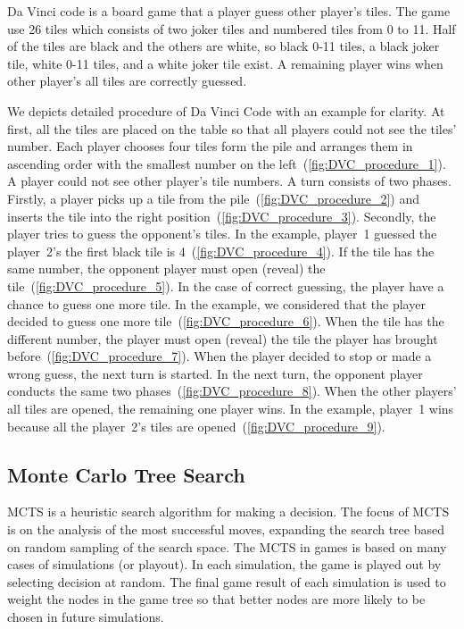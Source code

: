 Da Vinci code is a board game that a player guess other player's tiles.
The game use 26 tiles which consists of two joker tiles and numbered tiles from 0 to 11. 
Half of the tiles are black and the others are white, so black 0-11 tiles, a black joker tile, white 0-11 tiles, and a white joker tile exist.
A remaining player wins when other player's all tiles are correctly guessed.

We depicts detailed procedure of Da Vinci Code with an example for clarity.
At first, all the tiles are placed on the table so that all players could not see the tiles' number.
Each player chooses four tiles form the pile and arranges them in ascending order with the smallest number on the left~(\cref{fig:DVC_procedure_1}).
A player could not see other player's tile numbers.
A turn consists of two phases.
Firstly, a player picks up a tile from the pile~(\cref{fig:DVC_procedure_2}) and inserts the tile into the right position~(\cref{fig:DVC_procedure_3}).
Secondly, the player tries to guess the opponent's tiles.
In the example, player~1 guessed the player~2's the first black tile is 4~(\cref{fig:DVC_procedure_4}).
If the tile has the same number, the opponent player must open (reveal) the tile~(\cref{fig:DVC_procedure_5}).
In the case of correct guessing, the player have a chance to guess one more tile.
In the example, we considered that the player decided to guess one more tile~(\cref{fig:DVC_procedure_6}).
When the tile has the different number, the player must open (reveal) the tile the player has brought before~(\cref{fig:DVC_procedure_7}).
When the player decided to stop or made a wrong guess, the next turn is started.
In the next turn, the opponent player conducts the same two phases~(\cref{fig:DVC_procedure_8}).
When the other players' all tiles are opened, the remaining one player wins.
In the example, player~1 wins because all the player~2's tiles are opened~(\cref{fig:DVC_procedure_9}).

\subsection{Monte Carlo Tree Search} \label{sec:mcts}

MCTS is a heuristic search algorithm for making a decision.
The focus of MCTS is on the analysis of the most successful moves, expanding the search tree based on random sampling of the search space.
The MCTS in games is based on many cases of simulations (or playout).
In each simulation, the game is played out by selecting decision at random.
The final game result of each simulation is used to weight the nodes in the game tree so that better nodes are more likely to be chosen in future simulations.


